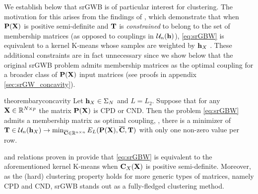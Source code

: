 We establish below that srGWB is of particular interest for clustering. The motivation for this arises from the findings of \citet{chen2023gromov}, which demonstrate that when ${\mathbf{P}}({\mathbf{X}})$ is positive semi-definite and ${\mathbf{T}}$ is \emph{constrained} to belong to the set of membership matrices (as opposed to couplings in ${\mathcal{U}}_n({\mathbf{h}})$), \cref{eq:srGBW} is equivalent to a kernel K-means whose samples are weighted by ${\mathbf{h}}_X$ \cite{dhillon2004kernel, dhillon2007weighted}. These additional constraints are in fact unnecessary since we show below that the original srGWB problem admits membership matrices as the optimal coupling for a broader class of ${\mathbf{P}}({\mathbf{X}})$ input matrices (see proofs in appendix \ref{sec:srGW_concavity}).%
\begin{restatable}{theorem}{baryconcavity}
	\label{theo:srgw_bary_concavity}
	Let ${\mathbf{h}}_X \in \Sigma_N$ and $L=L_2$. Suppose that for any ${\mathbf{X}} \in \mathbb{R}^{N \times p}$ the matrix ${\mathbf{P}}({\mathbf{X}})$ is CPD or CND. Then the problem \cref{eq:srGBW} admits a membership matrix as optimal coupling, \ie, there is a minimizer of ${\mathbf{T}} \in \mathcal{U}_n({\mathbf{h}}_X) \to \min_{\overline{{\mathbf{C}}} \in \mathbb{R}^{n \times n}}  E_L({\mathbf{P}}({\mathbf{X}}), \overline{{\mathbf{C}}}, {\mathbf{T}})$ with only one non-zero value per row.
\end{restatable}
 and relations proven in \citet{chen2023gromov} provide that  \cref{eq:srGBW} is equivalent to the aforementioned kernel K-means when ${\mathbf{C}}_X({\mathbf{X}})$ is positive semi-definite. Moreover, as the (hard) clustering property holds for more generic types of matrices, namely CPD and CND, srGWB stands out as a fully-fledged clustering method.
